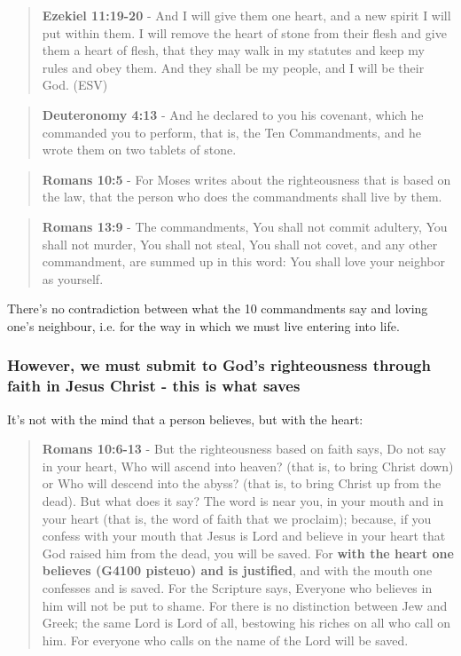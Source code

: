 \documentclass[11pt]{article}
\begin{document}
\begin{quote}
\textbf{Ezekiel 11:19-20} - And I will give them one heart, and a new spirit I will put within them. I will remove the heart of stone from their flesh and give them a heart of flesh, that they may walk in my statutes and keep my rules and obey them. And they shall be my people, and I will be their God. (ESV)
\end{quote}

\begin{quote}
\textbf{Deuteronomy 4:13} - And he declared to you his covenant, which he commanded you to perform, that is, the Ten Commandments, and he wrote them on two tablets of stone.
\end{quote}

\begin{quote}
\textbf{Romans 10:5} - For Moses writes about the righteousness that is based on the law, that the person who does the commandments shall live by them.
\end{quote}

\begin{quote}
\textbf{Romans 13:9} - The commandments, You shall not commit adultery, You shall not murder, You shall not steal, You shall not covet, and any other commandment, are summed up in this word: You shall love your neighbor as yourself.
\end{quote}

There's no contradiction between what the 10 commandments say and loving one's neighbour, i.e. for the way in which we must live entering into life.

\subsubsection{However, we must submit to God's righteousness through faith in Jesus Christ - this is what saves}
\label{sec:orgaa3c930}
It's not with the mind that a person believes, but with the heart:

\begin{quote}
\textbf{Romans 10:6-13} - But the righteousness based on faith says, Do not say in your heart, Who will ascend into heaven? (that is, to bring Christ down) or Who will descend into the abyss? (that is, to bring Christ up from the dead).  But what does it say? The word is near you, in your mouth and in your heart (that is, the word of faith that we proclaim); because, if you confess with your mouth that Jesus is Lord and believe in your heart that God raised him from the dead, you will be saved.  For \textbf{with the heart one believes (G4100 pisteuo) and is justified}, and with the mouth one confesses and is saved.  For the Scripture says, Everyone who believes in him will not be put to shame.  For there is no distinction between Jew and Greek; the same Lord is Lord of all, bestowing his riches on all who call on him.  For everyone who calls on the name of the Lord will be saved.
\end{quote}
\end{document}
